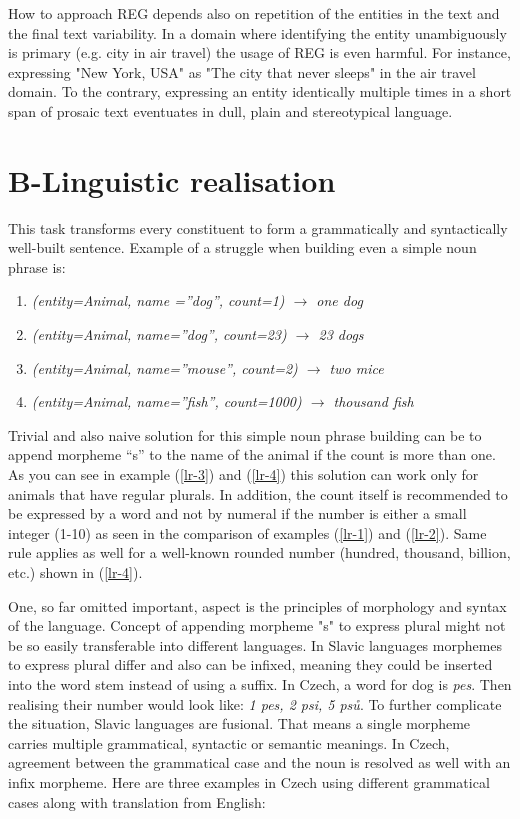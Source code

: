 How to approach REG depends also on repetition of the entities in the text and the final text variability. In a domain where identifying the entity unambiguously is primary (e.g. city in air travel) the usage of REG is even harmful. For instance, expressing "New York, USA" as "The city that never sleeps" in the air travel domain. To the contrary, expressing an entity identically multiple times in a short span of prosaic text eventuates in dull, plain and stereotypical language. 

\section{B-Linguistic realisation}
This task transforms every constituent to form a grammatically and syntactically well-built sentence. Example of a struggle when building even a simple noun phrase is:
\begin{enumerate}
	\item \emph{(entity=Animal, name =”dog”, count=1) $\rightarrow$ one dog} \label{lr-1}
	\item \emph{(entity=Animal, name=”dog”, count=23) $\rightarrow$ 23 dogs} \label{lr-2}
	\item \emph{(entity=Animal, name=”mouse”, count=2) $\rightarrow$ two mice} \label{lr-3}
	\item \emph{(entity=Animal, name=”fish”, count=1000) $\rightarrow$ thousand fish} \label{lr-4}
\end{enumerate}

Trivial and also naive solution for this simple noun phrase building can be to append morpheme “s” to the name of the animal if the count is more than one. As you can see in example (\ref{lr-3}) and (\ref{lr-4}) this solution can work only for animals that have regular plurals. In addition, the count itself is recommended to be expressed by a word and not by numeral if the number is either a small integer (1-10) as seen in the comparison of  examples (\ref{lr-1}) and (\ref{lr-2}). Same rule applies as well for a well-known rounded number (hundred, thousand, billion, etc.) shown in (\ref{lr-4}).

One, so far omitted important, aspect is the principles of morphology and syntax of the language. Concept of appending morpheme "s" to express plural might not be so easily transferable into different languages. In Slavic languages morphemes to express plural differ and also can be infixed, meaning they could be inserted into the word stem instead of using a suffix. In Czech, a word for dog is \emph{pes}. Then realising their number would look like: \emph{1 pes, 2 psi, 5 psů}. To further complicate the situation, Slavic languages are fusional. That means a single morpheme carries multiple grammatical, syntactic or semantic meanings. In Czech, agreement between the grammatical case and the noun is resolved as well with an infix morpheme. Here are three examples in Czech using different grammatical cases along with translation from English:

